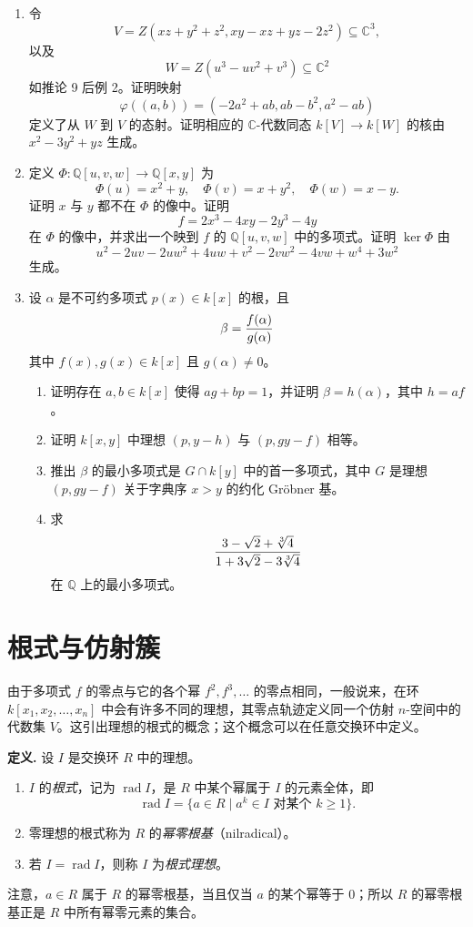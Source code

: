 \begin{enumerate}[label=\arabic*.]
	\item 令
	\[
	V=Z(xz+y^2+z^2,
	xy-xz+yz-2z^2)\subseteq\mathbb C^3,
	\]
	以及
	\[
	W=Z(u^3-uv^2+v^3)\subseteq\mathbb C^2
	\]
	如推论 9 后例 2。证明映射
	\[
	\varphi((a,b))=(-2a^2+ab,
	ab-b^2,
	a^2-ab)
	\]
	定义了从 $W$ 到 $V$ 的态射。证明相应的 $\mathbb C$-代数同态 $k[V]\to k[W]$ 的核由 $x^2-3y^2+yz$ 生成。
	
	\item 定义 $\Phi:\mathbb Q[u,v,w]\to\mathbb Q[x,y]$ 为
	\[
	\Phi(u)=x^2+y,
	\quad
	\Phi(v)=x+y^2,
	\quad
	\Phi(w)=x-y.
	\]
	证明 $x$ 与 $y$ 都不在 $\Phi$ 的像中。证明
	\[
	f=2x^3-4xy-2y^3-4y
	\]
	在 $\Phi$ 的像中，并求出一个映到 $f$ 的 $\mathbb Q[u,v,w]$ 中的多项式。证明 $\ker\Phi$ 由
	\[
	u^2-2uv-2uw^2+4uw+v^2-2vw^2-4vw+w^4+3w^2
	\]
	生成。
	
	\item 设 $\alpha$ 是不可约多项式 $p(x)\in k[x]$ 的根，且
	\[
	\beta={f(\alpha)\over g(\alpha)}
	\]
	其中 $f(x),g(x)\in k[x]$ 且 $g(\alpha)\ne0$。
	\begin{enumerate}[label=(\alph*)]
		\item 证明存在 $a,b\in k[x]$ 使得 $ag+bp=1$，并证明 $\beta=h(\alpha)$，其中 $h=af$。
		\item 证明 $k[x,y]$ 中理想 $(p,y-h)$ 与 $(p,gy-f)$ 相等。
		\item 推出 $\beta$ 的最小多项式是 $G\cap k[y]$ 中的首一多项式，其中 $G$ 是理想 $(p,gy-f)$ 关于字典序 $x>y$ 的约化 Gröbner 基。
		\item 求
		\[
		{3-\sqrt2+\sqrt[3]{4}\over 1+3\sqrt2-3\sqrt[3]{4}}
		\]
		在 $\mathbb Q$ 上的最小多项式。
	\end{enumerate}
\end{enumerate}

\section{根式与仿射簇}

由于多项式 $f$ 的零点与它的各个幂 $f^2,f^3,\ldots$ 的零点相同，一般说来，在环 $k[x_1,x_2,\ldots,x_n]$ 中会有许多不同的理想，其零点轨迹定义同一个仿射 $n$-空间中的代数集 $V$。这引出理想的根式的概念；这个概念可以在任意交换环中定义。

\noindent\textbf{定义.} 设 $I$ 是交换环 $R$ 中的理想。
\begin{enumerate}[label=(\arabic*)]
	\item $I$ 的\emph{根式}，记为 $\operatorname{rad}I$，是 $R$ 中某个幂属于 $I$ 的元素全体，即
	\[
	\operatorname{rad}I=\{a\in R\mid a^k\in I\text{ 对某个 }k\geq 1\}.
	\]
	\item 零理想的根式称为 $R$ 的\emph{幂零根基}（nilradical）。
	\item 若 $I=\operatorname{rad}I$，则称 $I$ 为\emph{根式理想}。
\end{enumerate}
注意，$a\in R$ 属于 $R$ 的幂零根基，当且仅当 $a$ 的某个幂等于 $0$；所以 $R$ 的幂零根基正是 $R$ 中所有幂零元素的集合。

